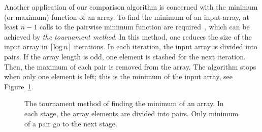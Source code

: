 	Another application of our comparison algorithm is concerned with the minimum (or maximum) function of an array.
	To find the minimum of an input array, at least $n-1$ calls to the pairwise minimum function are required~\cite[Chapter 9]{CLR09}, which can be achieved by \emph{the tournament method}.
	In this method, one reduces the size of the input array in $\left\lceil \log n \right\rceil$ iterations.
	In each iteration, the input array is divided into pairs. 
	If the array length is odd, one element is stashed for the next iteration. 
	Then, the maximum of each pair is removed from the array.
	The algorithm stops when only one element is left; this is the minimum of the input array, see Figure~\ref{fig:minimum_tournament}. 
	\begin{figure}
		\centering
		\caption{The tournament method of finding the minimum of an array. In each stage, the array elements are divided into pairs. Only minimum of a pair go to the next stage.}
		\label{fig:minimum_tournament}
	\end{figure}
	

